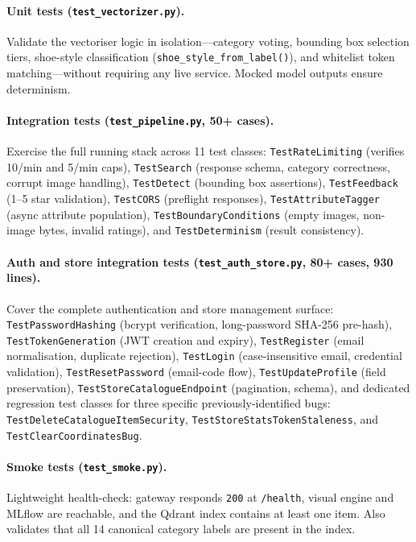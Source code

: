 \documentclass[12pt]{article}
\begin{document}
\paragraph{Unit tests (\texttt{test\_vectorizer.py}).}
Validate the vectoriser logic in isolation---category voting, bounding box selection tiers, shoe-style classification (\texttt{shoe\_style\_from\_label()}), and whitelist token matching---without requiring any live service. Mocked model outputs ensure determinism.

\paragraph{Integration tests (\texttt{test\_pipeline.py}, 50+ cases).}
Exercise the full running stack across 11 test classes: \texttt{TestRateLimiting} (verifies 10/min and 5/min caps), \texttt{TestSearch} (response schema, category correctness, corrupt image handling), \texttt{TestDetect} (bounding box assertions), \texttt{TestFeedback} (1--5 star validation), \texttt{TestCORS} (preflight responses), \texttt{TestAttributeTagger} (async attribute population), \texttt{TestBoundaryConditions} (empty images, non-image bytes, invalid ratings), and \texttt{TestDeterminism} (result consistency).

\paragraph{Auth and store integration tests (\texttt{test\_auth\_store.py}, 80+ cases, 930 lines).}
Cover the complete authentication and store management surface: \texttt{TestPasswordHashing} (bcrypt verification, long-password SHA-256 pre-hash), \texttt{TestTokenGeneration} (JWT creation and expiry), \texttt{TestRegister} (email normalisation, duplicate rejection), \texttt{TestLogin} (case-insensitive email, credential validation), \texttt{TestResetPassword} (email-code flow), \texttt{TestUpdateProfile} (field preservation), \texttt{TestStoreCatalogueEndpoint} (pagination, schema), and dedicated regression test classes for three specific previously-identified bugs: \texttt{TestDeleteCatalogueItemSecurity}, \texttt{TestStoreStatsTokenStaleness}, and \texttt{TestClearCoordinatesBug}.

\paragraph{Smoke tests (\texttt{test\_smoke.py}).}
Lightweight health-check: gateway responds \texttt{200} at \texttt{/health}, visual engine and MLflow are reachable, and the Qdrant index contains at least one item. Also validates that all 14 canonical category labels are present in the index.
\end{document}
